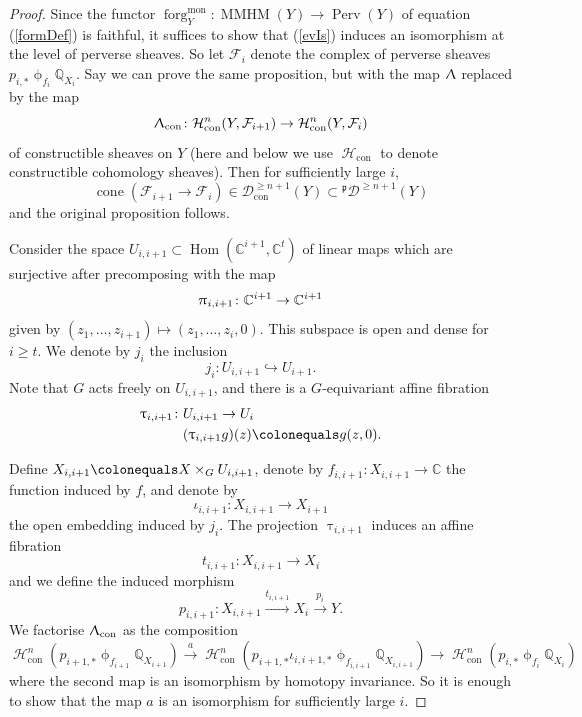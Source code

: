 \documentclass[a4paper,10pt]{amsart}
\renewcommand{\pi}{\uppi\hspace{0.05em}}
\renewcommand{\Lambda}{\Uplambda}
\renewcommand{\phi}{\upphi}
\renewcommand{\tau}{\uptau}
\DeclareMathOperator{\Hom}{Hom}
\DeclareMathOperator{\mon}{mon}
\DeclareMathOperator{\MMHM}{MMHM}
\DeclareMathOperator{\con}{con}
\DeclareMathOperator{\Perv}{Perv}
\DeclareMathOperator{\cone}{cone}
\DeclareMathOperator{\forg}{forg}
\newcommand{\form}[1]{\forg^{\mon}_{#1}}
\DeclareMathOperator{\Ho}{\mathcal{H}}
\newcommand{\Dp}{{}^{\mathfrak{p}}\mathcal{D}}
\begin{document}
\begin{proof}
Since the functor $\form{Y}\colon \MMHM(Y)\rightarrow\Perv(Y)$ of equation (\ref{formDef}) is faithful, it suffices to show that (\ref{evIs}) induces an isomorphism at the level of perverse sheaves.   So let $\mathcal{F}_i$ denote the complex of perverse sheaves $p_{i,*}\phi_{f_i}\mathbb{Q}_{X_i}$.  Say we can prove the same proposition, but with the map $\Lambda$ replaced by the map
\[
\Lambda_{\con}\colon \mathcal{H}_{\con}^{n}(Y,\mathcal{F}_{i+1})\rightarrow \mathcal{H}_{\con}^n(Y,\mathcal{F}_i)
\]
of constructible sheaves on $Y$ (here and below we use $\Ho_{\con}$ to denote constructible cohomology sheaves).  Then for sufficiently large $i$, 
\[
\cone(\mathcal{F}_{i+1}\rightarrow\mathcal{F}_i)\in \mathcal{D}_{\con}^{\geq n+1}(Y)\subset \Dp^{\geq n+1}(Y)
\]
and the original proposition follows.  

Consider the space $U_{i,i+1}\subset \Hom(\mathbb{C}^{i+1},\mathbb{C}^t)$ of linear maps which are surjective after precomposing with the map 
\[
\pi_{i,i+1}\colon \mathbb{C}^{i+1}\rightarrow \mathbb{C}^{i+1}
\]
given by $(z_1,\ldots,z_{i+1})\mapsto (z_1,\ldots,z_i,0)$.  This subspace is open and dense for $i\geq t$.  We denote by $j_i$ the inclusion
\[
j_i\colon U_{i,i+1}\hookrightarrow U_{i+1}.  
\]
Note that $G$ acts freely on $U_{i,i+1}$, and there is a $G$-equivariant affine fibration 
\begin{align*}
\tau_{i,i+1}\colon &U_{i,i+1}\rightarrow U_i\\
&(\tau_{i,i+1}g)(z)\colonequals  g(z,0).
\end{align*}


Define $X_{i,i+1}\colonequals X\times_G U_{i,i+1}$, denote by $f_{i,i+1}\colon  X_{i,i+1}\rightarrow \mathbb{C}$ the function induced by $f$, and denote by 
\begin{equation}
\label{taffDef}
\iota_{i,i+1}\colon X_{i,i+1}\rightarrow X_{i+1}
\end{equation}
the open embedding induced by $j_{i}$.  The projection $\tau_{i,i+1}$ induces an affine fibration 
\[
t_{i,i+1}\colon X_{i,i+1}\rightarrow X_{i}
\]
and we define the induced morphism
\begin{equation}
p_{i,i+1}\colon X_{i,i+1}\xrightarrow{t_{i,i+1}}X_i\xrightarrow{p_i} Y.
\end{equation}
We factorise $\Lambda_{\con}$ as the composition
\[
\Ho^n_{\con}(p_{i+1,*}\phi_{f_{i+1}}\mathbb{Q}_{X_{i+1}})\xrightarrow{a} \Ho^n_{\con}(p_{i+1,*}\iota_{i,i+1,*}\phi_{f_{i,i+1}}\mathbb{Q}_{X_{i,i+1}})\rightarrow \Ho^n_{\con}(p_{i,*}\phi_{f_i}\mathbb{Q}_{X_i})
\]
where the second map is an isomorphism by homotopy invariance.  So it is enough to show that the map $a$ is an isomorphism for sufficiently large $i$.  


\end{proof}
\end{document}
